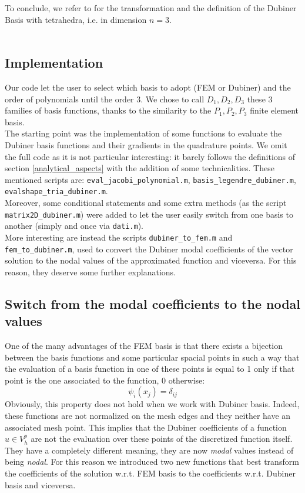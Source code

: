 \documentclass[a4paper,11pt]{article}
\begin{document}
    \noindent To conclude, we refer to \cite{sherwin} for the transformation and the definition of the Dubiner Basis with tetrahedra, i.e. in dimension $n=3$.\\ \\
    
    \subsection{Implementation}\label{subsection_implementation}
    Our code let the user to select which basis to adopt (FEM or Dubiner) and the order of polynomials until the order 3. We chose to call $D_1,D_2,D_3$ these 3 families of basis functions, thanks to the similarity to the $P_1,P_2,P_3$ finite element basis.\\
    The starting point was the implementation of some functions to evaluate the Dubiner basis functions and their gradients in the quadrature points. We omit the full code as it is not particular interesting: it barely follows the definitions of section \ref{analytical_aspects} with the addition of some technicalities. These mentioned scripts are: \texttt{eval\_jacobi\_polynomial.m}, \texttt{basis\_legendre\_dubiner.m}, \texttt{evalshape\_tria\_dubiner.m}.\\
    
    \noindent Moreover, some conditional statements and some extra methods (as the script \texttt{matrix2D\_dubiner.m}) were added to let the user easily switch from one basis to another (simply and once via \texttt{dati.m}). \\
    
    \noindent More interesting are instead the scripts \texttt{dubiner\_to\_fem.m} and \texttt{fem\_to\_dubiner.m}, used to convert the Dubiner modal coefficients of the vector solution to the nodal values of the approximated function and viceversa. For this reason, they deserve some further explanations.
\subsection{Switch from the modal coefficients to the nodal values}
One of the many advantages of the FEM basis is that there exists a bijection between the basis functions and some particular spacial points in such a way that the evaluation of a basis function in one of these points is equal to 1 only if that point is the one associated to the function, 0 otherwise:
	\begin{equation} \label{ref1}
	\psi_i(x_j)=\delta_{ij}
	\end{equation}
	Obviously, this property does not hold when we work with Dubiner basis. Indeed, these functions are not normalized on the mesh edges and they neither have an associated mesh point. This implies that the Dubiner coefficients of a function $u\in V_h^p$ are not the evaluation over these points of the discretized function itself. They have a completely different meaning, they are now \emph{modal} values instead of being \emph{nodal}.
	For this reason we introduced two new functions that best transform the coefficients of the solution w.r.t. FEM basis to the coefficients w.r.t. Dubiner basis and viceversa.\vspace{5mm}
	
\end{document}
